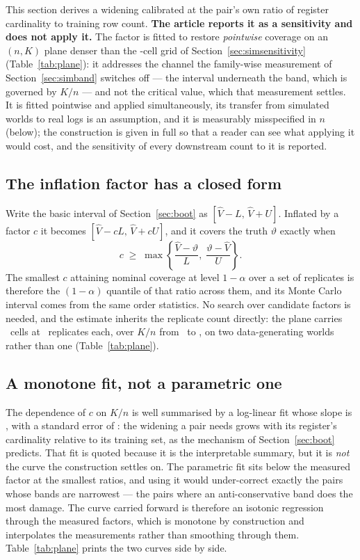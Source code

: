 This section derives a widening calibrated at the pair's own ratio of
register cardinality to training row count. \textbf{The article reports it
as a sensitivity and does not apply it.} The factor is fitted to restore
\emph{pointwise} coverage on an $(n, K)$ plane denser than the
\nSimGridCells-cell grid of Section~\ref{sec:simsensitivity}
(Table~\ref{tab:plane}): it addresses the channel the family-wise
measurement of Section~\ref{sec:simband} switches off --- the interval
underneath the band, which is governed by $K/n$ --- and not the critical
value, which that measurement settles. It is fitted pointwise and applied
simultaneously, its transfer from simulated worlds to real logs is an
assumption, and it is measurably misspecified in $n$ (below); the
construction is given in full so that a reader can see what applying it
would cost, and the sensitivity of every downstream count to it is reported.

\subsection{The inflation factor has a closed form}

Write the basic interval of Section~\ref{sec:boot} as
$[\hat V - L,\, \hat V + U]$. Inflated by a factor $c$ it becomes
$[\hat V - cL,\, \hat V + cU]$, and it covers the truth $\vartheta$ exactly
when
\[
c \;\geq\; \max\!\left\{\frac{\hat V - \vartheta}{L},\;
\frac{\vartheta - \hat V}{U}\right\}.
\]
The smallest $c$ attaining nominal coverage at level $1 - \alpha$ over a set
of replicates is therefore the $(1-\alpha)$ quantile of that ratio across
them, and its Monte Carlo interval comes from the same order statistics. No
search over candidate factors is needed, and the estimate inherits the
replicate count directly: the plane carries \nPlaneCells\ cells at
\nPlaneReps\ replicates each, over $K/n$ from \planeKnMin\ to \planeKnMax,
on two data-generating worlds rather than one (Table~\ref{tab:plane}).

\subsection{A monotone fit, not a parametric one}
\label{app:curves}

The dependence of $c$ on $K/n$ is well summarised by a log-linear fit whose
slope is \calSlope, with a standard error of \calSlopeSe: the widening a pair
needs grows with its register's cardinality relative to its training set, as
the mechanism of Section~\ref{sec:boot} predicts. That fit is quoted because
it is the interpretable summary, but it is \emph{not} the curve the
construction settles on. The parametric fit sits below the measured factor at
the smallest ratios, and using it would under-correct exactly the pairs whose
bands are narrowest --- the pairs where an anti-conservative band does the
most damage. The curve carried forward is therefore an isotonic regression
through the measured factors, which is monotone by construction and
interpolates the measurements rather than smoothing through them.
Table~\ref{tab:plane} prints the two curves side by side.

